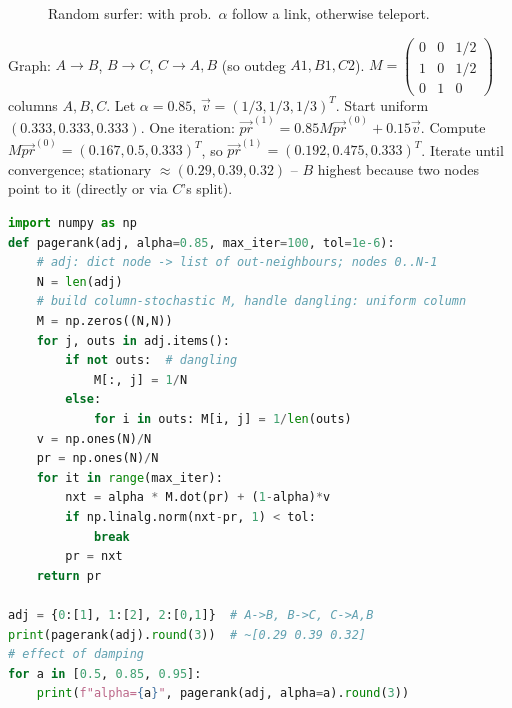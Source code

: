 \begin{figure}[h]\centering
{}
\caption{Random surfer: with prob.\ $\alpha$ follow a link, otherwise teleport.}
\label{fig:surfer}
\end{figure}

\begin{example}
Graph: $A\to B$, $B\to C$, $C\to A,B$ (so outdeg $A1,B1,C2$). $M=\begin{pmatrix}0&0&1/2\\1&0&1/2\\0&1&0\end{pmatrix}$ columns $A,B,C$. Let $\alpha=0.85$, $\vec{v}=(1/3,1/3,1/3)^T$. Start uniform $(0.333,0.333,0.333)$. One iteration: $\vec{pr}^{(1)}=0.85M\vec{pr}^{(0)}+0.15\vec{v}$. Compute $M\vec{pr}^{(0)}=(0.167,0.5,0.333)^T$, so $\vec{pr}^{(1)}=(0.192,0.475,0.333)^T$. Iterate until convergence; stationary $\approx(0.29,0.39,0.32)$ -- $B$ highest because two nodes point to it (directly or via $C$'s split).
\end{example}

\begin{lstlisting}[language=Python, caption={Power iteration for PageRank with dangling handling.}, label={lst:pagerank}]
import numpy as np
def pagerank(adj, alpha=0.85, max_iter=100, tol=1e-6):
    # adj: dict node -> list of out-neighbours; nodes 0..N-1
    N = len(adj)
    # build column-stochastic M, handle dangling: uniform column
    M = np.zeros((N,N))
    for j, outs in adj.items():
        if not outs:  # dangling
            M[:, j] = 1/N
        else:
            for i in outs: M[i, j] = 1/len(outs)
    v = np.ones(N)/N
    pr = np.ones(N)/N
    for it in range(max_iter):
        nxt = alpha * M.dot(pr) + (1-alpha)*v
        if np.linalg.norm(nxt-pr, 1) < tol:
            break
        pr = nxt
    return pr

adj = {0:[1], 1:[2], 2:[0,1]}  # A->B, B->C, C->A,B
print(pagerank(adj).round(3))  # ~[0.29 0.39 0.32]
# effect of damping
for a in [0.5, 0.85, 0.95]:
    print(f"alpha={a}", pagerank(adj, alpha=a).round(3))
\end{lstlisting}

